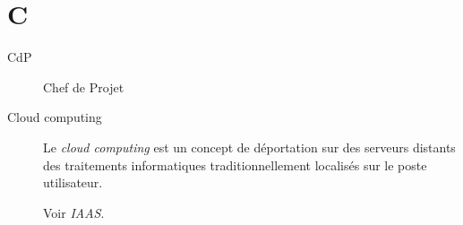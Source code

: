 \section{C}

\begin{description}

\item[CdP] Chef de Projet

\item[Cloud computing]
Le \textsl{cloud computing} est un concept de déportation sur des serveurs 
distants des traitements informatiques traditionnellement localisés sur le 
poste utilisateur.

Voir \textsl{IAAS}.

\end{description}
